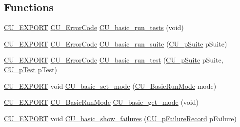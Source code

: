 \subsection*{Functions}
\begin{DoxyCompactItemize}
\item 
\hyperlink{group___framework_ga22e538403fdee24be3388ab473fe64d5}{C\+U\+\_\+\+E\+X\+P\+O\+R\+T} \hyperlink{group___framework_ga743a2a025ee3eb792d7d85f0eea347e6}{C\+U\+\_\+\+Error\+Code} \hyperlink{group___basic_gab8e9092071a6d97666451c1ea5cc4753}{C\+U\+\_\+basic\+\_\+run\+\_\+tests} (void)
\item 
\hyperlink{group___framework_ga22e538403fdee24be3388ab473fe64d5}{C\+U\+\_\+\+E\+X\+P\+O\+R\+T} \hyperlink{group___framework_ga743a2a025ee3eb792d7d85f0eea347e6}{C\+U\+\_\+\+Error\+Code} \hyperlink{group___basic_gad759648660e050dc43e31477ef2bf9e3}{C\+U\+\_\+basic\+\_\+run\+\_\+suite} (\hyperlink{group___framework_gaba832ae8b235f5e70d6a4ac9c3bb1219}{C\+U\+\_\+p\+Suite} p\+Suite)
\item 
\hyperlink{group___framework_ga22e538403fdee24be3388ab473fe64d5}{C\+U\+\_\+\+E\+X\+P\+O\+R\+T} \hyperlink{group___framework_ga743a2a025ee3eb792d7d85f0eea347e6}{C\+U\+\_\+\+Error\+Code} \hyperlink{group___basic_ga201394cc25e1f711c105652cf9a9eda8}{C\+U\+\_\+basic\+\_\+run\+\_\+test} (\hyperlink{group___framework_gaba832ae8b235f5e70d6a4ac9c3bb1219}{C\+U\+\_\+p\+Suite} p\+Suite, \hyperlink{group___framework_ga249c43fbe4e53452b3f90db1437da04b}{C\+U\+\_\+p\+Test} p\+Test)
\item 
\hyperlink{group___framework_ga22e538403fdee24be3388ab473fe64d5}{C\+U\+\_\+\+E\+X\+P\+O\+R\+T} void \hyperlink{group___basic_ga4a816b2dbd39aef96875a561e43026be}{C\+U\+\_\+basic\+\_\+set\+\_\+mode} (\hyperlink{group___basic_ga2f7ec57f8b59cfef5c5600bafa4865a6}{C\+U\+\_\+\+Basic\+Run\+Mode} mode)
\item 
\hyperlink{group___framework_ga22e538403fdee24be3388ab473fe64d5}{C\+U\+\_\+\+E\+X\+P\+O\+R\+T} \hyperlink{group___basic_ga2f7ec57f8b59cfef5c5600bafa4865a6}{C\+U\+\_\+\+Basic\+Run\+Mode} \hyperlink{group___basic_ga10cca27673fb32e100b27d72b9868956}{C\+U\+\_\+basic\+\_\+get\+\_\+mode} (void)
\item 
\hyperlink{group___framework_ga22e538403fdee24be3388ab473fe64d5}{C\+U\+\_\+\+E\+X\+P\+O\+R\+T} void \hyperlink{group___basic_ga42f85f17df1cd5fd68d0c20be273a878}{C\+U\+\_\+basic\+\_\+show\+\_\+failures} (\hyperlink{group___framework_gafe3d04f76bf2fac18a3b6a9fd9368308}{C\+U\+\_\+p\+Failure\+Record} p\+Failure)
\end{DoxyCompactItemize}


